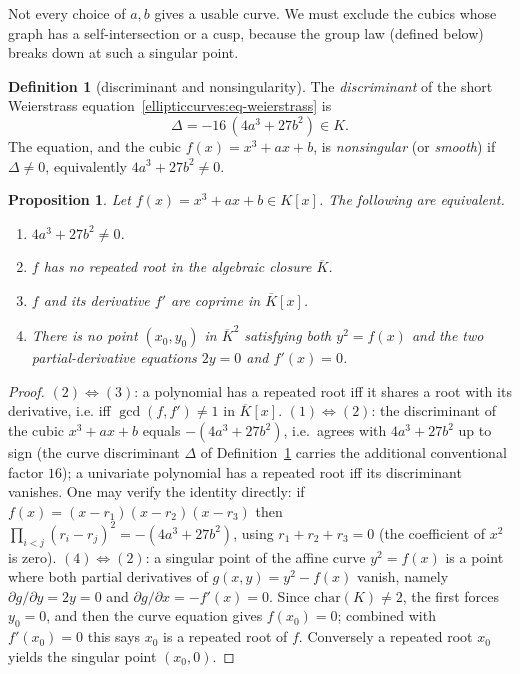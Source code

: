 \documentclass[11pt,a4paper]{article}
\newtheorem{proposition}[theorem]{Proposition}
\theoremstyle{definition}
\newtheorem{definition}[theorem]{Definition}
\theoremstyle{remark}
\begin{document}
Not every choice of \(a, b\) gives a usable curve. We must exclude the cubics whose graph has a self-intersection or a cusp, because the group law (defined below) breaks down at such a singular point.

\begin{definition}[discriminant and nonsingularity]\label{ellipticcurves:def-discriminant}
The \emph{discriminant} of the short Weierstrass equation~\eqref{ellipticcurves:eq-weierstrass} is
\begin{equation}\label{ellipticcurves:eq-discriminant}
  \Delta = -16\,(4 a^3 + 27 b^2) \in K .
\end{equation}
The equation, and the cubic \(f(x) = x^3 + ax + b\), is \emph{nonsingular} (or \emph{smooth}) if \(\Delta \neq 0\), equivalently \(4 a^3 + 27 b^2 \neq 0\).
\end{definition}

\begin{proposition}\label{ellipticcurves:prop-smooth}
Let \(f(x) = x^3 + ax + b \in K[x]\). The following are equivalent.
\begin{enumerate}
  \item \(4a^3 + 27 b^2 \neq 0\).
  \item \(f\) has no repeated root in the algebraic closure \(\overline{K}\).
  \item \(f\) and its derivative \(f'\) are coprime in \(\overline{K}[x]\).
  \item There is no point \((x_0, y_0)\) in \(\overline{K}^2\) satisfying both \(y^2 = f(x)\) and the two partial-derivative equations \(2y = 0\) and \(f'(x) = 0\).
\end{enumerate}
\end{proposition}

\begin{proof}
\((2)\Leftrightarrow(3)\): a polynomial has a repeated root iff it shares a root with its derivative, i.e. iff \(\gcd(f, f') \neq 1\) in \(\overline{K}[x]\). \((1)\Leftrightarrow(2)\): the discriminant of the cubic \(x^3 + ax + b\) equals \(-(4a^3 + 27 b^2)\), i.e.\ agrees with \(4a^3 + 27 b^2\) up to sign (the curve discriminant \(\Delta\) of Definition~\ref{ellipticcurves:def-discriminant} carries the additional conventional factor \(16\)); a univariate polynomial has a repeated root iff its discriminant vanishes. One may verify the identity directly: if \(f(x) = (x-r_1)(x-r_2)(x-r_3)\) then \(\prod_{i<j}(r_i - r_j)^2 = -(4a^3 + 27b^2)\), using \(r_1 + r_2 + r_3 = 0\) (the coefficient of \(x^2\) is zero). \((4)\Leftrightarrow(2)\): a singular point of the affine curve \(y^2 = f(x)\) is a point where both partial derivatives of \(g(x,y) = y^2 - f(x)\) vanish, namely \(\partial g/\partial y = 2y = 0\) and \(\partial g/\partial x = -f'(x) = 0\). Since \(\mathrm{char}(K) \neq 2\), the first forces \(y_0 = 0\), and then the curve equation gives \(f(x_0) = 0\); combined with \(f'(x_0) = 0\) this says \(x_0\) is a repeated root of \(f\). Conversely a repeated root \(x_0\) yields the singular point \((x_0, 0)\).
\end{proof}
\end{document}
